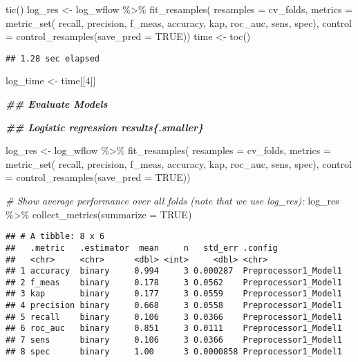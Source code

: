 \documentclass[
]{article}
\newenvironment{Shaded}{\begin{snugshade}}{\end{snugshade}}
\newcommand{\AttributeTok}[1]{\textcolor[rgb]{0.77,0.63,0.00}{#1}}
\newcommand{\CommentTok}[1]{\textcolor[rgb]{0.56,0.35,0.01}{\textit{#1}}}
\newcommand{\ConstantTok}[1]{\textcolor[rgb]{0.00,0.00,0.00}{#1}}
\newcommand{\DecValTok}[1]{\textcolor[rgb]{0.00,0.00,0.81}{#1}}
\newcommand{\DocumentationTok}[1]{\textcolor[rgb]{0.56,0.35,0.01}{\textbf{\textit{#1}}}}
\newcommand{\FunctionTok}[1]{\textcolor[rgb]{0.00,0.00,0.00}{#1}}
\newcommand{\NormalTok}[1]{#1}
\newcommand{\OtherTok}[1]{\textcolor[rgb]{0.56,0.35,0.01}{#1}}
\newcommand{\SpecialCharTok}[1]{\textcolor[rgb]{0.00,0.00,0.00}{#1}}
\begin{document}
\begin{Shaded}
\begin{Highlighting}[]
\FunctionTok{tic}\NormalTok{()}
\NormalTok{log\_res }\OtherTok{\textless{}{-}}\NormalTok{ log\_wflow }\SpecialCharTok{\%\textgreater{}\%} 
  \FunctionTok{fit\_resamples}\NormalTok{(}
    \AttributeTok{resamples =}\NormalTok{ cv\_folds, }
    \AttributeTok{metrics =} \FunctionTok{metric\_set}\NormalTok{(}
\NormalTok{      recall, precision, f\_meas, accuracy,}
\NormalTok{      kap, roc\_auc, sens, spec),}
    \AttributeTok{control =} \FunctionTok{control\_resamples}\NormalTok{(}\AttributeTok{save\_pred =} \ConstantTok{TRUE}\NormalTok{)) }
\NormalTok{time }\OtherTok{\textless{}{-}} \FunctionTok{toc}\NormalTok{()}
\end{Highlighting}
\end{Shaded}

\begin{verbatim}
## 1.28 sec elapsed
\end{verbatim}

\begin{Shaded}
\begin{Highlighting}[]
\NormalTok{log\_time }\OtherTok{\textless{}{-}}\NormalTok{ time[[}\DecValTok{4}\NormalTok{]]}

\DocumentationTok{\#\# Evaluate Models}

\DocumentationTok{\#\# Logistic regression results\{.smaller\}}

\NormalTok{log\_res }\OtherTok{\textless{}{-}}\NormalTok{ log\_wflow }\SpecialCharTok{\%\textgreater{}\%} 
  \FunctionTok{fit\_resamples}\NormalTok{(}
    \AttributeTok{resamples =}\NormalTok{ cv\_folds, }
    \AttributeTok{metrics =} \FunctionTok{metric\_set}\NormalTok{(}
\NormalTok{      recall, precision, f\_meas, accuracy,}
\NormalTok{      kap, roc\_auc, sens, spec),}
    \AttributeTok{control =} \FunctionTok{control\_resamples}\NormalTok{(}\AttributeTok{save\_pred =} \ConstantTok{TRUE}\NormalTok{)) }

\CommentTok{\# Show average performance over all folds (note that we use log\_res):}
\NormalTok{log\_res }\SpecialCharTok{\%\textgreater{}\%}  \FunctionTok{collect\_metrics}\NormalTok{(}\AttributeTok{summarize =} \ConstantTok{TRUE}\NormalTok{)}
\end{Highlighting}
\end{Shaded}

\begin{verbatim}
## # A tibble: 8 x 6
##   .metric   .estimator  mean     n   std_err .config             
##   <chr>     <chr>      <dbl> <int>     <dbl> <chr>               
## 1 accuracy  binary     0.994     3 0.000287  Preprocessor1_Model1
## 2 f_meas    binary     0.178     3 0.0562    Preprocessor1_Model1
## 3 kap       binary     0.177     3 0.0559    Preprocessor1_Model1
## 4 precision binary     0.668     3 0.0558    Preprocessor1_Model1
## 5 recall    binary     0.106     3 0.0366    Preprocessor1_Model1
## 6 roc_auc   binary     0.851     3 0.0111    Preprocessor1_Model1
## 7 sens      binary     0.106     3 0.0366    Preprocessor1_Model1
## 8 spec      binary     1.00      3 0.0000858 Preprocessor1_Model1
\end{verbatim}
\end{document}
